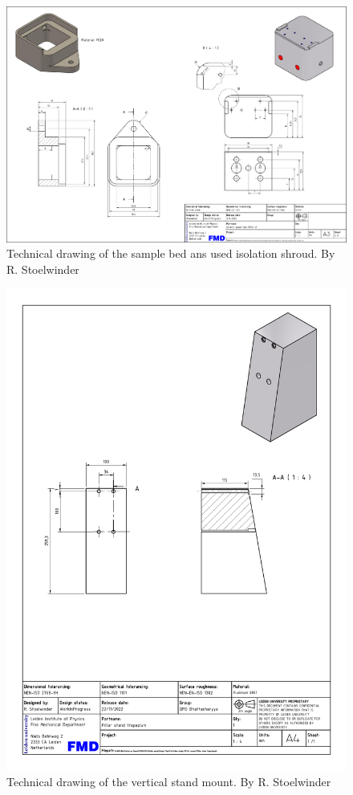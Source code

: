 \documentclass[10pt]{article}
\begin{document}
\clearpage
\begin{figure}[htp]
  \centering
  \includegraphics[angle=90,origin=c,width=\textwidth]{img/cad/pag3.pdf}
  \caption{Technical drawing of the sample bed ans used isolation shroud. By R. Stoelwinder}
  \label{doc:tech_bed}
\end{figure}

\clearpage
\begin{figure}[htp] 
  \centering
  \includegraphics[origin=c,width=\textwidth]{img/cad/Pillar stand trapezium.0001.pdf}
  \caption{Technical drawing of the vertical stand mount. By R. Stoelwinder}
  \label{doc:tech_trap_mount}
\end{figure}
\end{document}
